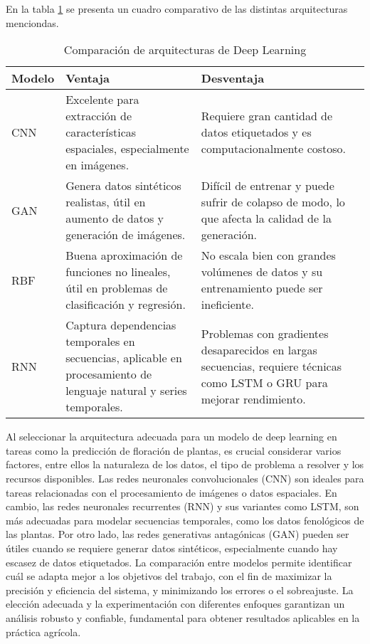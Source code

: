 En la tabla \ref{tab:redes_dl} se presenta un cuadro comparativo de las distintas arquitecturas menciondas.

\begin{table}[h]
    \centering
    \caption{Comparación de arquitecturas de Deep Learning}
    \renewcommand{\arraystretch}{1} %
    \begin{tabular}{|>{\raggedright}m{2cm}|m{5cm}|m{5cm}|} %
        \hline
        \textbf{\large Modelo} & \textbf{\large Ventaja} & \textbf{\large Desventaja} \\
        \hline
        \large CNN & \large Excelente para extracción de características espaciales, especialmente en imágenes. 
		& \large Requiere gran cantidad de datos etiquetados y es computacionalmente costoso. \\
        \hline
        \large GAN & \large Genera datos sintéticos realistas, útil en aumento de datos y generación de imágenes. 
		& \large Difícil de entrenar y puede sufrir de colapso de modo, lo que afecta la calidad de la generación. \\
        \hline
        \large RBF & \large Buena aproximación de funciones no lineales, útil en problemas de clasificación y regresión.
		 & \large No escala bien con grandes volúmenes de datos y su entrenamiento puede ser ineficiente. \\
        \hline
        \large RNN & \large Captura dependencias temporales en secuencias, aplicable en procesamiento de lenguaje natural 
		y series temporales. & \large Problemas con gradientes desaparecidos en largas secuencias, requiere técnicas como 
		LSTM o GRU para mejorar rendimiento.\\
        \hline
    \end{tabular}
    \label{tab:redes_dl}
\end{table}


	Al seleccionar la arquitectura adecuada para un modelo de deep learning en tareas como la predicción de
	floración de plantas, es crucial considerar varios factores, entre ellos la naturaleza de los datos, el tipo
	de problema a resolver y los recursos disponibles. Las redes neuronales convolucionales (CNN) son 
  	ideales para tareas relacionadas con el procesamiento de imágenes o datos espaciales. En cambio, 
  	las redes neuronales recurrentes (RNN) y sus variantes como LSTM, son más adecuadas para modelar 
  	secuencias temporales, como los datos fenológicos de las plantas. Por otro lado, las redes generativas
   	antagónicas (GAN) pueden ser útiles cuando se requiere generar datos sintéticos, especialmente 
   	cuando hay escasez de datos etiquetados. La comparación entre modelos permite identificar cuál se adapta
	mejor a los objetivos del trabajo, con el fin de maximizar la precisión y eficiencia del sistema, y 
	minimizando los errores o el sobreajuste. La elección adecuada y la experimentación con diferentes
	enfoques garantizan un análisis robusto y confiable, fundamental para obtener resultados
	aplicables en la práctica agrícola.

